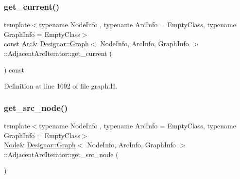 \subsubsection{\texorpdfstring{get\+\_\+current()}{get\_current()}\hspace{0.1cm}{\footnotesize\ttfamily [2/2]}}
{\footnotesize\ttfamily template$<$typename Node\+Info , typename Arc\+Info  = Empty\+Class, typename Graph\+Info  = Empty\+Class$>$ \\
const \hyperlink{class_designar_1_1_graph_a74c730ef4ce2d20f998d72bd25c2b5bf}{Arc}\& \hyperlink{class_designar_1_1_graph}{Designar\+::\+Graph}$<$ Node\+Info, Arc\+Info, Graph\+Info $>$\+::Adjacent\+Arc\+Iterator\+::get\+\_\+current (\begin{DoxyParamCaption}{ }\end{DoxyParamCaption}) const\hspace{0.3cm}{\ttfamily [inline]}}



Definition at line 1692 of file graph.\+H.

\mbox{\label{class_designar_1_1_graph_1_1_adjacent_arc_iterator_a0a5f3238f6abde756b4498a31558a255}} 
\subsubsection{\texorpdfstring{get\+\_\+src\+\_\+node()}{get\_src\_node()}\hspace{0.1cm}{\footnotesize\ttfamily [1/2]}}
{\footnotesize\ttfamily template$<$typename Node\+Info , typename Arc\+Info  = Empty\+Class, typename Graph\+Info  = Empty\+Class$>$ \\
\hyperlink{class_designar_1_1_graph_a5dfc7dba9d092ac489c72e40390c37d0}{Node}\& \hyperlink{class_designar_1_1_graph}{Designar\+::\+Graph}$<$ Node\+Info, Arc\+Info, Graph\+Info $>$\+::Adjacent\+Arc\+Iterator\+::get\+\_\+src\+\_\+node (\begin{DoxyParamCaption}{ }\end{DoxyParamCaption})\hspace{0.3cm}{\ttfamily [inline]}}




